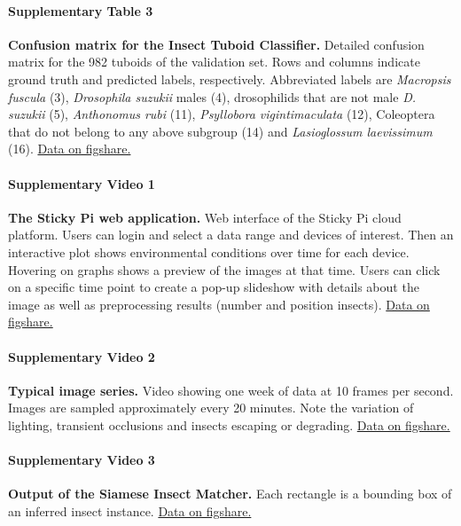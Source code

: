 \documentclass[12pt]{article}
\begin{document}
	\paragraph*{Supplementary Table 3}
	\textbf{Confusion matrix for the Insect Tuboid Classifier.} 
	Detailed confusion matrix for the 982 tuboids of the validation set.
	Rows and columns indicate ground truth and predicted labels, respectively.
	Abbreviated labels are \emph{Macropsis fuscula} (3), \emph{Drosophila suzukii} males (4), drosophilids that are not male \emph{D. suzukii} (5), \emph{Anthonomus rubi} (11), \emph{Psyllobora vigintimaculata} (12), Coleoptera that do not belong to any above subgroup (14) and \emph{Lasioglossum laevissimum} (16).
    \href{https://figshare.com/s/7585a7cb174160a1c416}{Data on figshare.}

	
	
	\paragraph*{Supplementary Video 1}
	\textbf{The Sticky Pi web application.} Web interface of the Sticky Pi cloud platform. Users can login and select a data range and devices of interest. Then an interactive plot shows environmental conditions over time for each device. Hovering on graphs shows a preview of the images at that time. Users can click on a specific time point to create a pop-up slideshow with details about the image as well as preprocessing results (number and position insects).
	\href{https://figshare.com/s/e901a8943d4459cb8f08}{Data on figshare.}

	
	\paragraph*{Supplementary Video 2}
	\textbf{Typical image series.} Video showing one week of data at 10 frames per second. Images are sampled approximately every 20 minutes. Note the variation of lighting, transient occlusions and insects escaping or degrading.
	\href{https://figshare.com/s/02944865bfd645047355}{Data on figshare.}

	\paragraph*{Supplementary Video 3}
	\textbf{Output of the Siamese Insect Matcher.} Each rectangle is a bounding box of an inferred insect instance.
	\href{https://figshare.com/s/096d4a80b93f8380c156}{Data on figshare.}
\end{document}

